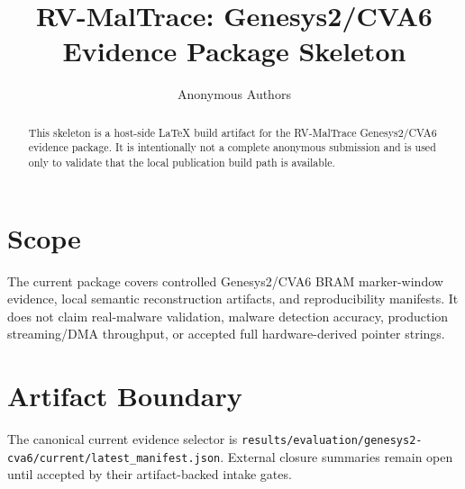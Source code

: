 \documentclass{article}
\title{RV-MalTrace: Genesys2/CVA6 Evidence Package Skeleton}
\author{Anonymous Authors}
\date{}
\begin{document}
\maketitle

\begin{abstract}
This skeleton is a host-side LaTeX build artifact for the RV-MalTrace
Genesys2/CVA6 evidence package. It is intentionally not a complete anonymous
submission and is used only to validate that the local publication build path
is available.
\end{abstract}

\section{Scope}
The current package covers controlled Genesys2/CVA6 BRAM marker-window evidence,
local semantic reconstruction artifacts, and reproducibility manifests. It does
not claim real-malware validation, malware detection accuracy, production
streaming/DMA throughput, or accepted full hardware-derived pointer strings.

\section{Artifact Boundary}
The canonical current evidence selector is
\texttt{results/evaluation/genesys2-cva6/current/latest\_manifest.json}.
External closure summaries remain open until accepted by their artifact-backed
intake gates.
\end{document}
